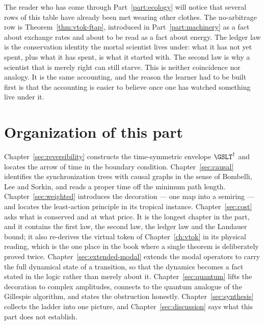 The reader who has come through Part~\ref{part:ecology} will notice that
several rows of this table have already been met wearing other clothes.
The no-arbitrage row is Theorem~\ref{thm:vtok-ftap}, introduced in
Part~\ref{part:machinery} as a fact about exchange rates and about to be
read as a fact about energy.
The ledger law is the conservation identity the mortal scientist lives
under: what it has not yet spent, plus what it has spent, is what it
started with.
The second law is why a scientist that is merely right can still starve.
This is neither coincidence nor analogy.
It is the same accounting, and the reason the learner had to be built
first is that the accounting is easier to believe once one has watched
something live under it.

\section{Organization of this part}

Chapter~\ref{sec:reversibility} constructs the time-symmetric envelope
$\GSLT^\dagger$ and locates the arrow of time in the boundary condition.
Chapter~\ref{sec:causal} identifies the synchronization trees with causal
graphs in the sense of Bombelli, Lee and Sorkin, and reads a proper time
off the minimum path length.
Chapter~\ref{sec:weighted} introduces the decoration --- one map into a
semiring --- and locates the least-action principle in its tropical
instance.
Chapter~\ref{sec:cost} asks what is conserved and at what price.
It is the longest chapter in the part, and it contains the first law, the
second law, the ledger law and the Landauer bound; it also re-derives the
virtual token of Chapter~\ref{ch:vtok} in its physical reading, which is
the one place in the book where a single theorem is deliberately proved
twice.
Chapter~\ref{sec:extended-modal} extends the modal operators to carry the
full dynamical state of a transition, so that the dynamics becomes a fact
stated in the logic rather than merely about it.
Chapter~\ref{sec:quantum} lifts the decoration to complex amplitudes,
connects to the quantum analogue of the Gillespie algorithm, and states
the obstruction honestly.
Chapter~\ref{sec:synthesis} collects the ladder into one picture, and
Chapter~\ref{sec:discussion} says what this part does not establish.

